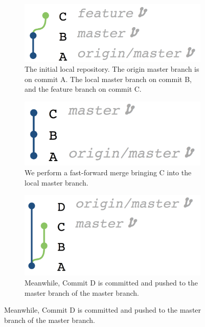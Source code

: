 \begin{figure}[htpb]
  \centering

  \begin{subfigure}[b]{0.3\textwidth}
    \includegraphics[width=\textwidth]{Figures/background/foxtrot/step_1.png}
    \caption{The initial local repository.
      The origin master branch is on commit A.
      The local master branch on commit B, and the feature branch on commit C.}
  \end{subfigure}
  \begin{subfigure}[b]{0.3\textwidth}
    \includegraphics[width=\textwidth]{Figures/background/foxtrot/step_2.png}
    \caption{We perform a fast-forward merge bringing C into the local master branch.}
  \end{subfigure}
  \begin{subfigure}[b]{0.3\textwidth}
    \includegraphics[width=\textwidth]{Figures/background/foxtrot/step_3.png}
    \caption{Meanwhile, Commit D is committed and pushed to the master
      branch of the master branch.}
  \end{subfigure}


\end{figure}
